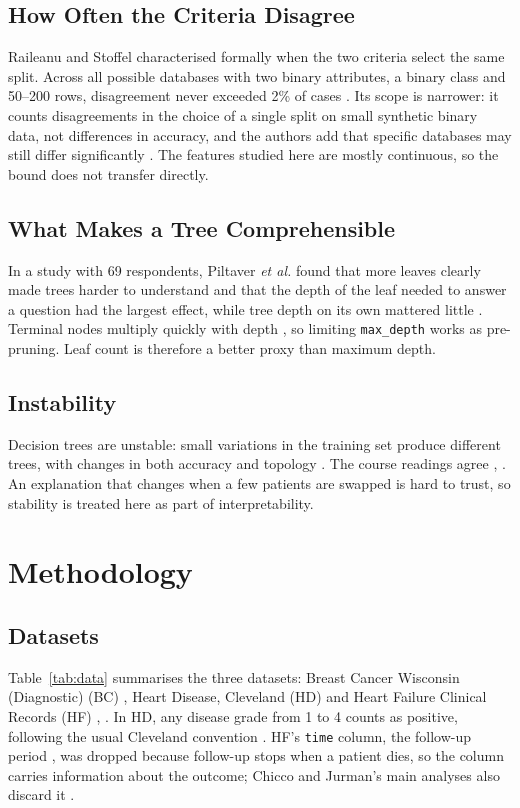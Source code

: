 \documentclass[conference,10pt]{IEEEtran}
\begin{document}
\subsection{How Often the Criteria Disagree}
Raileanu and Stoffel characterised formally when the two criteria select the same split. Across all possible databases with two binary attributes, a binary class and 50--200 rows, disagreement never exceeded 2\% of cases \cite{raileanu2004}. Its scope is narrower: it counts disagreements in the choice of a single split on small synthetic binary data, not differences in accuracy, and the authors add that specific databases may still differ significantly \cite{raileanu2004}. The features studied here are mostly continuous, so the bound does not transfer directly.

\subsection{What Makes a Tree Comprehensible}
In a study with 69 respondents, Piltaver \textit{et al.} found that more leaves clearly made trees harder to understand and that the depth of the leaf needed to answer a question had the largest effect, while tree depth on its own mattered little \cite{piltaver2016}. Terminal nodes multiply quickly with depth \cite{molnar2025}, so limiting \texttt{max\_depth} works as pre-pruning. Leaf count is therefore a better proxy than maximum depth.

\subsection{Instability}
Decision trees are unstable: small variations in the training set produce different trees, with changes in both accuracy and topology \cite{last2002}. The course readings agree \cite{molnar2025}, \cite{kavlakoglu2021}. An explanation that changes when a few patients are swapped is hard to trust, so stability is treated here as part of interpretability.

\section{Methodology}
\subsection{Datasets}
Table~\ref{tab:data} summarises the three datasets: Breast Cancer Wisconsin (Diagnostic) (BC) \cite{wolberg1993}, Heart Disease, Cleveland (HD) \cite{janosi1989} and Heart Failure Clinical Records (HF) \cite{uci2020hf}, \cite{chicco2020}. In HD, any disease grade from 1 to 4 counts as positive, following the usual Cleveland convention \cite{janosi1989}. HF's \texttt{time} column, the follow-up period \cite{uci2020hf}, was dropped because follow-up stops when a patient dies, so the column carries information about the outcome; Chicco and Jurman's main analyses also discard it \cite{chicco2020}.
\end{document}
